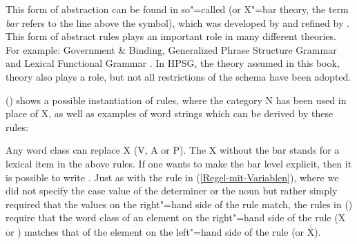 This form of abstraction can be found in so"=called \xbart (or X"=bar theory, the term \emph{bar}
refers to the line above the symbol), which was developed by \citet{Chomsky70a} and refined by
\citet{Jackendoff77a}. This form of abstract rules plays an important role in many different
theories. For example: Government \& Binding\indexgb \citep{Chomsky81a}, Generalized Phrase
Structure Grammar\indexgpsg \citep{GKPS85a,Uszkoreit87a} and Lexical Functional Grammar\indexlfg
\citep{Bresnan82a-ed,BATW2016a}. In HPSG\indexhpsg, the theory assumed in this book, \xbar theory also plays
a role, but not all restrictions of the \xbar schema have been adopted.

\largerpage
() shows a possible instantiation of \xbar rules, where the category N has been used in place of X, as well as examples of word strings
which can be derived by these rules:
\eanoraggedright
\label{psg-xbar-schema}
\z

\noindent
Any word class can replace X (\eg V, A or P). The X without the bar stands for a lexical item in
the above rules. If one wants to make the bar level explicit, then it is possible to write \xnull. 
Just as with the rule in (\ref{Regel-mit-Variablen}), where we did not specify the case value of the
determiner or the noun but rather simply required that the values on the right"=hand side of the
rule match, the rules in () require that the word class of an element on the right"=hand side
of the rule (X or \xbar) matches that of the element on the left"=hand side of the rule (\xbar or
$\overline{\overline{\mbox{X}}}$).

